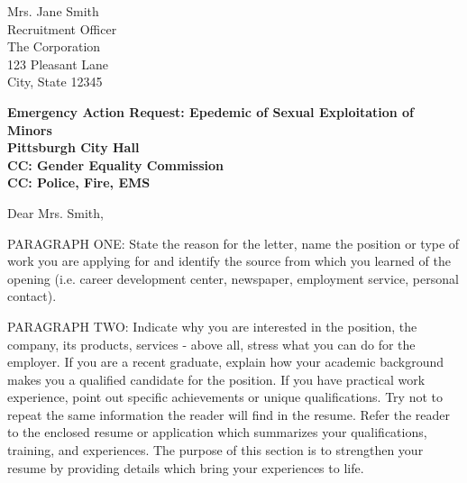 \documentclass[11pt]{letter} %
\begin{document}
\begin{letter}{Mrs. Jane Smith \\
Recruitment Officer \\
The Corporation \\
123 Pleasant Lane \\
City, State 12345}


\begin{center}
\large\bf Emergency Action Request: Epedemic of Sexual Exploitation of Minors \\ %
Pittsburgh City Hall \\ CC: Gender Equality Commission \\ CC: Police, Fire, EMS %
\end{center}
\vfill

\signature{John Smith} %


\opening{Dear Mrs. Smith,}

PARAGRAPH ONE: State the reason for the letter, name the position or type of work you are applying for and identify the source from which you learned of the opening (i.e. career development center, newspaper, employment service, personal contact).

PARAGRAPH TWO: Indicate why you are interested in the position, the company, its products, services - above all, stress what you can do for the employer. If you are a recent graduate, explain how your academic background makes you a qualified candidate for the position. If you have practical work experience, point out specific achievements or unique qualifications. Try not to repeat the same information the reader will find in the resume. Refer the reader to the enclosed resume or application which summarizes your qualifications, training, and experiences. The purpose of this section is to strengthen your resume by providing details which bring your experiences to life.


\end{letter}
\end{document}
